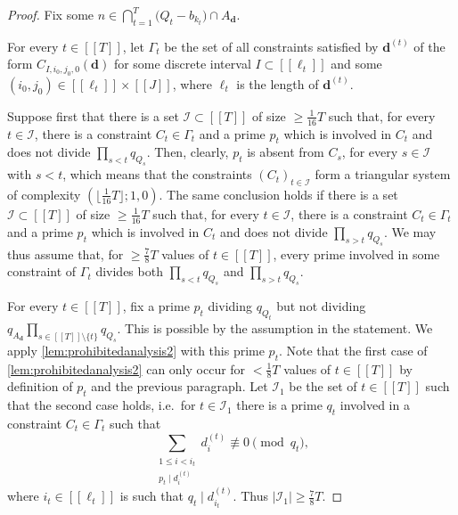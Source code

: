 \documentclass[11pt]{amsart}
\theoremstyle{definition}
\renewcommand{\leq}{\leqslant}
\renewcommand{\geq}{\geqslant}
\newcommand{\sinterval}[1]{[\![#1]\!] }
\newcommand{\abs}[1]{\left|#1\right|}
\renewcommand{\d}{\boldsymbol{d}}
\newcommand{\sommespart}{b}
\newcommand{\progression}{A_{\d}}
\newcommand{\modulus}{q}
\newcommand{\indexset}{\mathcal{I}}
\newcommand{\newR}{\sinterval{J}}
\newcommand{\nellp}[1]{\ell_{#1}}
\newcommand{\ncond}{T}
\newcommand{\mprimeone}{p}
\newcommand{\mprimetwo}{q}
\begin{document}
\begin{proof}
Fix some $n\in \bigcap_{t=1}^{\ncond} \big(Q_t - \sommespart_{k_t}\big) \cap \progression$. 

For every $t\in \sinterval{\ncond}$, let $\Gamma_t$ be the set of all constraints satisfied by $\d^{(t)}$ of the form $C_{I,i_0,j_0,0}(\d)$ for some discrete interval $I\subset \sinterval{\nellp{t}}$ and some $(i_0,j_0)\in \sinterval{\nellp{t}} \!\times\! \newR$, where $\nellp{t}$ is the length of $\d^{(t)}$.

Suppose first that there is a set $\indexset\subset \sinterval{\ncond}$ of size $\geq \tfrac{1}{16} \ncond$ such that, for every $t\in \indexset$, there is a constraint $C_t\in \Gamma_t$ and a prime $\mprimeone_t$ which is involved in $C_t$ and does not divide $\prod_{s<t}\modulus_{Q_s}$. Then, clearly, $\mprimeone_t$ is absent from $C_s$, for every $s\in \indexset$ with $s<t$, which means that the constraints $(C_t)_{t\in \indexset}$ form a triangular system of complexity $(\lfloor \tfrac{1}{16} \ncond\rfloor; 1, 0)$. The same conclusion holds if there is a set $\indexset\subset \sinterval{\ncond}$ of size $\geq \tfrac{1}{16} \ncond$ such that, for every $t\in \indexset$, there is a constraint $C_t\in \Gamma_t$ and a prime $\mprimeone_t$ which is involved in $C_t$ and does not divide $\prod_{s>t}\modulus_{Q_s}$. We may thus assume that, for $\geq \tfrac{7}{8} \ncond$ values of $t\in \sinterval{\ncond}$, every prime involved in some constraint of $\Gamma_t$ divides both $\prod_{s<t}\modulus_{Q_s}$ and $\prod_{s>t}\modulus_{Q_s}$.
 
For every $t\in \sinterval{\ncond}$, fix a prime $\mprimeone_t$ dividing $\modulus_{Q_t}$ but not dividing $\modulus_{\progression}\prod_{s\in \sinterval{\ncond}\setminus \{t\}}\modulus_{Q_s}$. This is possible by the assumption in the statement. We apply \cref{lem:prohibitedanalysis2} with this prime $\mprimeone_t$. Note that the first case of \cref{lem:prohibitedanalysis2} can only occur for $<\tfrac{1}{8}\ncond$ values of $t\in \sinterval{\ncond}$ by definition of $\mprimeone_t$ and the previous paragraph. Let $\indexset_1$ be the set of $t\in \sinterval{\ncond}$ such that the second case holds, i.e.~for $t\in \indexset_1$ there is a prime $\mprimetwo_t$ involved in a constraint $C_t\in \Gamma_t$ such that 
\begin{equation}
\label{eq:propertyofpt}
	\sum_{\substack{1\leq i<i_t\\ \mprimeone_t\mid d^{(t)}_i}} d^{(t)}_i \not\equiv 0 \pmod{\mprimetwo_t},
\end{equation}
where $i_t\in \sinterval{\nellp{t}}$ is such that $\mprimetwo_t\mid d^{(t)}_{i_t}$. Thus $\abs{\indexset_1}\geq \tfrac78 \ncond$. 


\end{proof}
\end{document}
